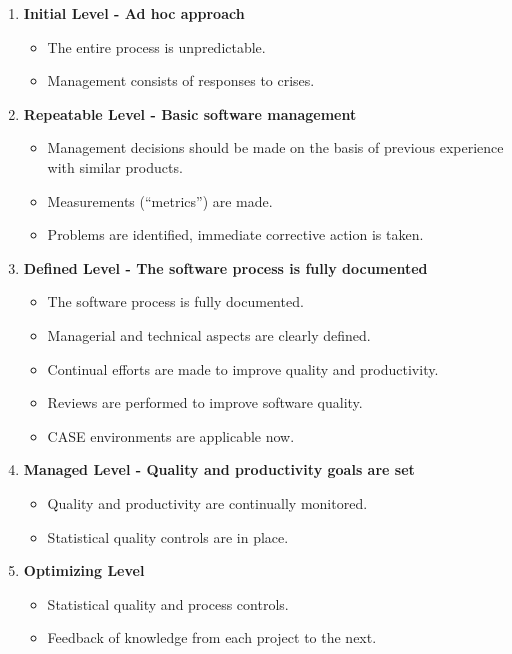 \documentclass[11pt]{article}
\begin{document}
\begin{enumerate}

	\item \textbf{Initial Level - Ad hoc approach}
	
	\begin{itemize}
		\item The entire process is unpredictable.
		\item Management consists of responses to crises.
	\end{itemize}

	\item \textbf{Repeatable Level - Basic software management}
	
	\begin{itemize}
		\item Management decisions should be made on the basis of previous experience with similar products.
		\item Measurements (“metrics”) are made.
		\item Problems are identified, immediate corrective action is taken.
	\end{itemize}
	
	\item \textbf{Defined Level - The software process is fully documented}
	
	\begin{itemize}
		\item The software process is fully documented. 
		\item Managerial and technical aspects are clearly defined. 
		\item Continual efforts are made to improve quality and productivity. 
		\item Reviews are performed to improve software quality. 
		\item CASE environments are applicable now.
	\end{itemize}

	\item \textbf{Managed Level - Quality and productivity goals are set}
	
	\begin{itemize}
		\item Quality and productivity are continually monitored.
		\item Statistical quality controls are in place.
	\end{itemize}

	\item \textbf{Optimizing Level}

	\begin{itemize}
		\item Statistical quality and process controls.
		\item Feedback of knowledge from each project to the next.
	\end{itemize}

\end{enumerate}
\end{document}
